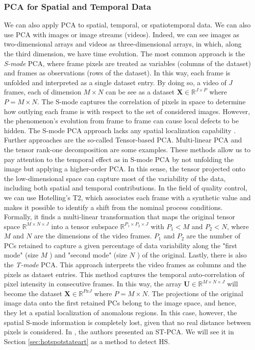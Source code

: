 \subsubsection{PCA for Spatial and Temporal Data}
We can also apply PCA to spatial, temporal, or spatiotemporal data. We can also use PCA with images or image streams (videos). Indeed, we can see images as two-dimensional arrays and videos as three-dimensional arrays, in which, along the third dimension, we have time evolution. The most common approach is the \emph{S-mode} PCA, where frame pixels are treated as variables (columns of the dataset) and frames as observations (rows of the dataset). In this way, each frame is unfolded and interpreted as a single dataset entry. By doing so, a video of $J$ frames, each of dimension $M\times N$ can be see as a dataset $\mathbf{X}\in\mathbb{R}^{J\times P}$ where $P=M\times N$. The S-mode captures the correlation of pixels in space to determine how outlying each frame is with respect to the set of considered images. However, the phenomenon's evolution from frame to frame can cause local defects to be hidden. The S-mode PCA approach lacks any spatial localization capability \cite{colosimo_spatially_2018}. Further approaches are the so-called Tensor-based PCA. Multi-linear PCA and the tensor rank-one decomposition are some examples. These methods allow us to pay attention to the temporal effect as in S-mode PCA by not unfolding the image but applying a higher-order PCA. In this sense, the tensor projected onto the low-dimensional space can capture most of the variability of the data, including both spatial and temporal contributions. In the field of quality control, we can use Hotelling's T2, which associates each frame with a synthetic value and makes it possible to identify a shift from the nominal process conditions. Formally, it finds a multi-linear transformation that maps the original tensor space $\mathbb{R}^{M \times N \times J}$ into a tensor subspace $\mathbb{R}^{P_1 \times P_2 \times J}$ with $P_1<M$ and $P_2<N$, where $M$ and $N$ are the dimensions of the video frames. $P_1$ and $P_2$ are the number of PCs retained to capture a given percentage of data variability along the "first mode" (size $M$ ) and "second mode" (size $N$ ) of the original. Lastly, there is also the \emph{T-mode} PCA. This approach interprets the video frames as columns and the pixels as dataset entries. This method captures the temporal auto-correlation of pixel intensity in consecutive frames. In this way, the array $\mathbf{U}\in \mathbb{R}^{M\times N \times J}$ will become the dataset $\mathbf{X}\in \mathbb{R}^{PxJ}$ where $P=M\times N$. The projections of the original image data onto the first retained PCs belong to the image space, and hence, they let a spatial localization of anomalous regions. In this case, however, the spatial S-mode information is completely lost, given that no real distance between pixels is considered. In \citeauthor{colosimo_spatially_2018}, the authors presented an ST-PCA. We will see it in Section \ref{sec:hotspotstateart} as a method to detect HS.

